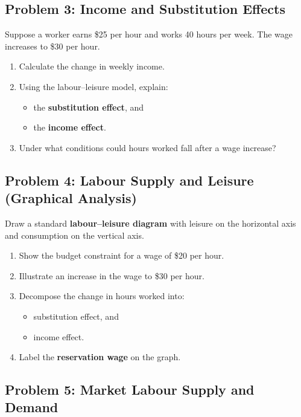 \documentclass[12pt]{article}
\begin{document}
\bigskip\bigskip

\subsection*{Problem 3: Income and Substitution Effects}

Suppose a worker earns \$25 per hour and works 40 hours per week. The wage increases to \$30 per hour.

\begin{enumerate}
    \item Calculate the change in weekly income.
    \item Using the labour--leisure model, explain:
    \begin{itemize}
        \item the \textbf{substitution effect}, and
        \item the \textbf{income effect}.
    \end{itemize}
    \item Under what conditions could hours worked fall after a wage increase?
\end{enumerate}

\bigskip\bigskip

\subsection*{Problem 4: Labour Supply and Leisure (Graphical Analysis)}

Draw a standard \textbf{labour--leisure diagram} with leisure on the horizontal axis and consumption on the vertical axis.

\begin{enumerate}
    \item Show the budget constraint for a wage of \$20 per hour.
    \item Illustrate an increase in the wage to \$30 per hour.
    \item Decompose the change in hours worked into:
    \begin{itemize}
        \item substitution effect, and
        \item income effect.
    \end{itemize}
    \item Label the \textbf{reservation wage} on the graph.
\end{enumerate}

\bigskip\bigskip

\subsection*{Problem 5: Market Labour Supply and Demand}
\end{document}
